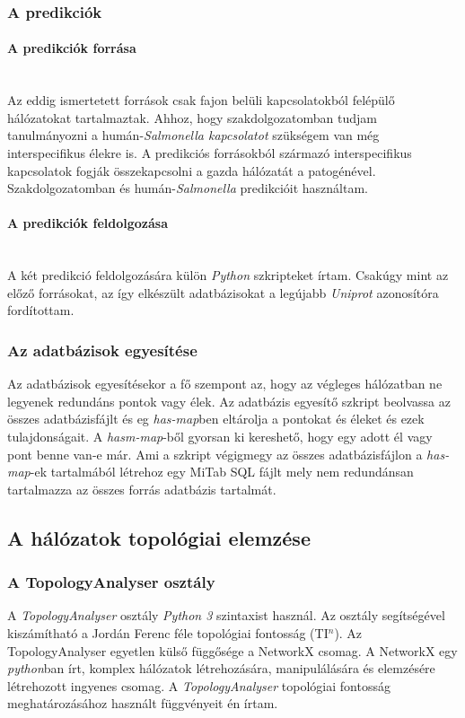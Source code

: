 \documentclass[a4paper,12pt]{article}
\begin{document}
		\subsubsection{A predikciók}
			
			\paragraph{A predikciók forrása} \mbox{}\\
			Az eddig ismertetett források csak fajon belüli kapcsolatokból felépülő hálózatokat tartalmaztak. Ahhoz, hogy szakdolgozatomban tudjam tanulmányozni a humán-\textit{Salmonella kapcsolatot} szükségem van még interspecifikus élekre is. A predikciós forrásokból származó interspecifikus kapcsolatok fogják összekapcsolni a gazda hálózatát a patogénével. Szakdolgozatomban \cite{Krishnadev} és \cite{Kshirsagar} humán-\textit{Salmonella} predikcióit használtam.
			
			\paragraph{A predikciók feldolgozása} \mbox{}\\
			A két predikció feldolgozására külön \textit{Python} szkripteket írtam. Csakúgy mint az előző forrásokat, az így elkészült adatbázisokat a legújabb \textit{Uniprot} azonosítóra fordítottam.
			
			
		

	\subsubsection{Az adatbázisok egyesítése}
		Az adatbázisok egyesítésekor a fő szempont az, hogy az végleges hálózatban ne legyenek redundáns pontok vagy élek. Az adatbázis egyesítő szkript beolvassa az összes adatbázisfájlt és eg \textit{has-map}ben eltárolja a pontokat és éleket és ezek tulajdonságait. A \textit{hasm-map}-ből gyorsan ki kereshető, hogy egy adott él vagy pont benne van-e már. Ami a szkript végigmegy az összes adatbázisfájlon a \textit{has-map}-ek tartalmából létrehoz egy MiTab SQL fájlt mely nem redundánsan tartalmazza az összes forrás adatbázis tartalmát.

	\subsection{A hálózatok topológiai elemzése}
	
		\subsubsection{A TopologyAnalyser osztály}
		A \textit{TopologyAnalyser} osztály \textit{Python 3} szintaxist használ. Az osztály segítségével kiszámítható a Jordán Ferenc féle topológiai fontosság (TI$^n$). Az TopologyAnalyser egyetlen külső függősége a NetworkX csomag. A NetworkX egy \textit{python}ban írt, komplex hálózatok létrehozására, manipulálására és elemzésére létrehozott ingyenes csomag. A \textit{TopologyAnalyser} topológiai fontosság meghatározásához használt függvényeit én írtam.
		
\end{document}
